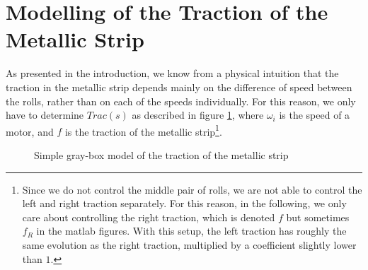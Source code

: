 \section{Modelling of the Traction of the Metallic Strip}
As presented in the introduction, we know from a physical intuition that the traction in the metallic strip depends mainly on the difference of speed between the rolls, rather than on each of the speeds individually. For this reason, we only have to determine $Trac(s)$ as described in figure \ref{fig:tractionInput}, where $\omega_i$ is the speed of a motor, and $f$ is the traction of the metallic strip\footnote{Since we do not control the middle pair of rolls, we are not able to control the left and right traction separately. For this reason, in the following, we only care about controlling the right traction, which is denoted $f$ but sometimes $f_R$ in the matlab figures. With this setup, the left traction has roughly the same evolution as the right traction, multiplied by a coefficient slightly lower than $1$.}.
\begin{figure}[htbp]
\centering
{}
\caption{\label{fig:tractionInput}Simple gray-box model of the traction of the metallic strip}
\end{figure}


